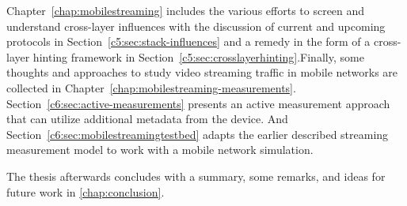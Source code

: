 Chapter~\ref{chap:mobilestreaming} includes the various efforts to screen and understand cross-layer influences with the discussion of current and upcoming protocols in Section~\ref{c5:sec:stack-influences} and a remedy in the form of a cross-layer hinting framework in Section~\ref{c5:sec:crosslayerhinting}.Finally, some thoughts and approaches to study video streaming traffic in mobile networks are collected in Chapter~\ref{chap:mobilestreaming-measurements}. Section~\ref{c6:sec:active-measurements} presents an active measurement approach that can utilize additional metadata from the device. And Section~\ref{c6:sec:mobilestreamingtestbed} adapts the earlier described streaming measurement model to work with a mobile network simulation.

The thesis afterwards concludes with a summary, some remarks, and ideas for future work in \ref{chap:conclusion}.










